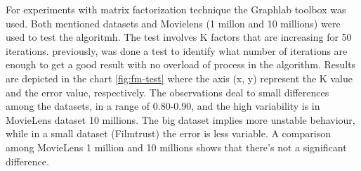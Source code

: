 For experiments with matrix factorization technique the Graphlab
toolbox was used. Both mentioned datasets and Movielens (1 millon and
10 millions) were used to test the algoritmh. The test involves K
factors that are increasing for 50 iterations. previously, was done a
test to identify what number of iterations are enough to get a good
result with no overload of process in the algorithm. Results are
depicted in the chart \ref{fig:fm-test}  where the axis (x, y)
represent the K value and the error value, respectively. The
observations deal to small differences among the datasets, in a range
of 0.80-0.90, and the high variability is in MovieLens dataset 10
millions. The big dataset implies more unstable behaviour, while in a
small dataset (Filmtrust) the error is less variable. A comparison
among MovieLens 1 million and 10 millions shows that there's not a
significant difference.


